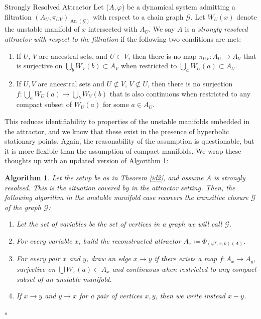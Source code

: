 \documentclass[11pt, a4paper]{memoir}
\theoremstyle{break}
\theoremstyle{break}
\newtheorem{inneralg}{Algorithm}
\newenvironment{alg}{\begin{inneralg}}{\ensuremath{\circ}\end{inneralg}}
\theoremstyle{nonumberplain}
\DeclareMathOperator{\an}{An}
\begin{document}
\begin{mydefinition}{Strongly Resolved Attractor}
Let ($A,\varphi$) be a dynamical system admitting a filtration $(A_U,\pi_{UV})_{\an(\mathcal{G})}$ with respect to a chain graph $\mathcal{G}$. Let $W_U(x)$ denote the unstable manifold of $x$ intersected with $A_U$. We say $A$ is a \emph{strongly resolved attractor with respect to the filtration} if the following two conditions are met:
\begin{enumerate}[label=(\roman*)]
	\item If $U$, $V$ are ancestral sets, and $U\subset V$, then there is no map $\pi_{UV}:A_U\to A_V$ that is surjective on $\bigcup_b W_V(b)\subset A_V$ when restricted to $\bigcup_a W_U(a)\subset A_U$.
	\item If $U,V$ are ancestral sets and $U\not\subset V$, $V\not\subset U$, then there is no surjection $f:\bigcup_{a} W_U(a)\to\bigcup_b W_V(b)$ that is also continuous when restricted to any compact subset of $W_U(a)$ for some $a\in A_U$.
\end{enumerate}
\end{mydefinition}
This reduces identifiability to properties of the unstable manifolds embedded in the attractor, and we know that these exist in the presence of hyperbolic stationary points. Again, the reasonability of the assumption is questionable, but it is more flexible than the assumption of compact manifolds. We wrap these thoughts up with an updated version of Algorithm \ref{trans}:
\begin{alg}\label{trans}
Let the setup be as in Theorem \ref{id2}, and assume $A$ is strongly resolved. This is the situation covered by \cite{mathFound} in the attractor setting. Then, the following algorithm in the unstable manifold case recovers the transitive closure $\overline{\mathcal{G}}$ of the graph $\mathcal{G}$:
\begin{enumerate}[label=(\roman*)]
	\item Let the set of variables be the set of vertices in a graph we will call $\mathcal{G}$.
	\item For every variable $x$, build the reconstructed attractor $A_x\coloneqq \Phi	_{(\varphi^T,x,k)(A)}$.
	\item For every pair $x$ and $y$, draw an edge $x\to y$ if there exists a map $f:A_x\to A_y$, surjective on $\bigcup W_x(a)\subset A_x$ and continuous when restricted to any compact subset of an unstable manifold.
	\item If $x\to y$ and $y\to x$ for a pair of vertices $x,y$, then we write instead $x-y$.
\end{enumerate}
\end{alg}
\end{document}
